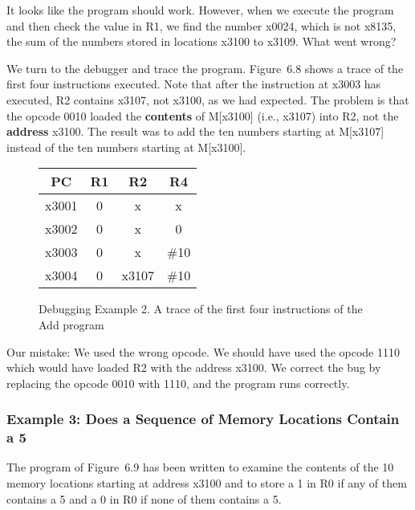 \documentclass{patt}
\begin{document}
It looks like the program should work.  However, when we execute the
program and then check the value in R1, we find the number x0024,
which is not x8135, the sum of the numbers stored in locations
x3100 to x3109.  What went wrong?

We turn to the debugger and trace the program.  Figure~6.8 shows a
trace of the first four instructions executed.  Note that after the
instruction at x3003 has executed, R2 contains x3107, not
x3100, as we had expected. The problem is that the opcode 0010
loaded the {\bf contents} of M[x3100] (i.e., x3107) into R2, not 
the {\bf address} x3100.  The result was to add the ten numbers starting 
at M[x3107] instead of the ten numbers starting at M[x3100].  

\setcounter{figure}{7}
\begin{figure}[p]
\vspace{-12pt}
\noindent\small
\begin{minipage}{36pc}
\begin{center}
\renewcommand{\tabcolsep}{5pt}%
\begin{tabular}{| c | c | c | c |}
\hline
PC    & R1   &  R2   &  R4 \\
\hline
x3001 & 0    &   x   &   x  \\
x3002 & 0    &   x   &   0  \\
x3003 & 0    &   x   & \#10  \\
x3004 & 0    & x3107 & \#10  \\
\hline
\end{tabular}
\end{center}
\caption{Debugging Example 2.  A trace of the first four instructions of the 
Add program}
\end{minipage}
\end{figure}

\FloatBarrier
Our mistake: We used the wrong opcode.  We should have used the opcode
1110 which would have loaded R2 with the address x3100.  We correct the
bug by replacing the opcode 0010 with 1110, and the program runs correctly.

\subsubsection{Example 3: Does a Sequence of Memory Locations Contain a 5}
The program of Figure~6.9 has been written to examine the contents of
the 10 memory locations starting at address x3100 and to store a 1
in R0 if any of them contains a 5 and a 0 in R0 if none of them
contains a 5.
\end{document}
